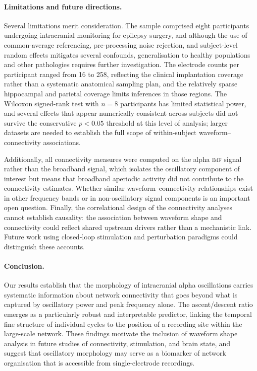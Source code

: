 \documentclass[11pt, a4paper]{article}
\newcommand{\imf}{\textsc{imf}}
\begin{document}
\paragraph{Limitations and future directions.}
Several limitations merit consideration. The sample comprised eight
participants undergoing intracranial monitoring for epilepsy surgery, and
although the use of common-average referencing, pre-processing noise
rejection, and subject-level random effects mitigates several confounds,
generalisation to healthy populations and other pathologies requires
further investigation. The electrode counts per participant ranged from 16
to 258, reflecting the clinical implantation coverage rather than a
systematic anatomical sampling plan, and the relatively sparse hippocampal
and parietal coverage limits inferences in those regions. The Wilcoxon
signed-rank test with $n = 8$ participants has limited statistical power,
and several effects that appear numerically consistent across subjects did
not survive the conservative $p < 0.05$ threshold at this level of
analysis; larger datasets are needed to establish the full scope of
within-subject waveform--connectivity associations.

Additionally, all connectivity measures were computed on the alpha \imf
signal rather than the broadband signal, which isolates the oscillatory
component of interest but means that broadband aperiodic activity
\citep{donoghue2022parameterizing} did not contribute to the connectivity
estimates. Whether similar waveform--connectivity relationships exist in
other frequency bands or in non-oscillatory signal components is an
important open question. Finally, the correlational design of the
connectivity analyses cannot establish causality: the association between
waveform shape and connectivity could reflect shared upstream drivers
rather than a mechanistic link. Future work using closed-loop stimulation
and perturbation paradigms could distinguish these accounts.

\paragraph{Conclusion.}
Our results establish that the morphology of intracranial alpha oscillations
carries systematic information about network connectivity that goes beyond
what is captured by oscillatory power and peak frequency alone. The
ascent/descent ratio emerges as a particularly robust and interpretable
predictor, linking the temporal fine structure of individual cycles to the
position of a recording site within the large-scale network. These findings
motivate the inclusion of waveform shape analysis in future studies of
connectivity, stimulation, and brain state, and suggest that oscillatory
morphology may serve as a biomarker of network organisation that is
accessible from single-electrode recordings.
\end{document}
